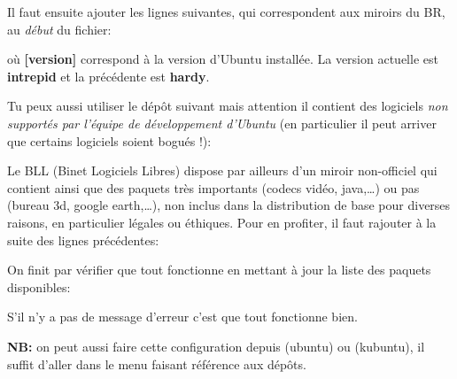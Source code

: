 
Il faut ensuite ajouter les lignes suivantes, qui correspondent aux miroirs du BR, au \emph{d\'ebut} du fichier:


o\`u \textbf{[version]} correspond \`a la version d'Ubuntu install\'ee. La version actuelle est \textbf{intrepid} et la pr\'ec\'edente est \textbf{hardy}.

Tu peux aussi utiliser le d\'ep\^ot suivant mais attention il contient des logiciels \emph{non support\'es par l'\'equipe de d\'eveloppement d'Ubuntu} (en particulier il peut arriver que certains logiciels soient bogu\'es !):



Le BLL (Binet Logiciels Libres) dispose par ailleurs d'un miroir non-officiel qui contient  ainsi que des paquets tr\`es importants (codecs
vid\'eo, java,\dots) ou pas (bureau 3d, google earth,\dots), non inclus dans la distribution de base pour diverses raisons, en particulier l\'egales ou
\'ethiques. Pour en profiter, il faut rajouter \`a la suite des lignes pr\'ec\'edentes:



On finit par v\'erifier que tout fonctionne en mettant \`a jour la liste
des paquets disponibles:


S'il n'y a pas de message d'erreur c'est que tout fonctionne bien.

\textbf{NB:} on peut aussi faire cette configuration depuis  (ubuntu) ou  (kubuntu), il suffit d'aller dans le menu faisant r\'ef\'erence aux d\'ep\^ots.
